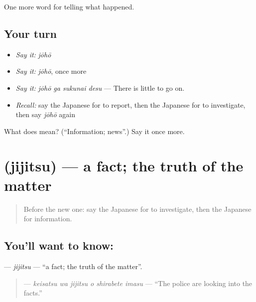 \begin{grammarlens}[title={What you've built}]
One more word for telling what happened.
\end{grammarlens}

\subsection*{Your turn}
\begin{itemize}
\raggedright
  \item \emph{Say it:} \emph{jōhō}
  \item \emph{Say it:} \emph{jōhō}, once more
  \item \emph{Say it:} \emph{jōhō ga sukunai desu} — There is little to go on.
  \item \emph{Recall:} say the Japanese for to report, then the Japanese for to investigate, then say \emph{jōhō} again
\end{itemize}

\begin{tcolorbox}[breakable,colback=teal!4,colframe=teal!35!black,title={Before you move on}]
What does  mean? (\textquotedblleft{}Information; news\textquotedblright{}.) Say it once more.
\end{tcolorbox}
\section[\texorpdfstring{\ja{じじつ} (jijitsu)}{じじつ (jijitsu)}]{ (jijitsu) — a fact; the truth of the matter}

\label{lesson:JA-C283-jijitsu}



\begin{quote}
Before the new one: say the Japanese for to investigate, then the Japanese for information.
\end{quote}

\subsection*{You'll want to know: }
\textbf{} — \emph{jijitsu} — \textquotedblleft{}a fact; the truth of the matter\textquotedblright{}.

\begin{quote}
\textbf{  } — \emph{keisatsu wa jijitsu o shirabete imasu} — \textquotedblleft{}The police are looking into the facts.\textquotedblright{}
\end{quote}

